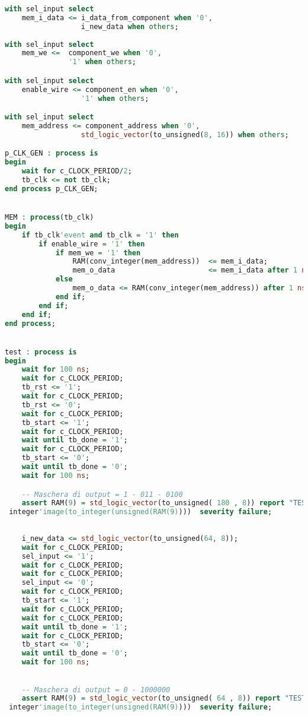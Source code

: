 \documentclass [a4paper, 12pt]{article}
\begin{document}
\begin{lstlisting}[language=VHDL, caption=tb\_pfrl\_2020\_repeated.vhd, basicstyle=\tiny, breaklines]
with sel_input select
    mem_i_data <= i_data_from_component when '0',
                  i_new_data when others;
                  
with sel_input select
    mem_we <=  component_we when '0',
               '1' when others;

with sel_input select
    enable_wire <= component_en when '0',
                  '1' when others;

with sel_input select
    mem_address <= component_address when '0',
                  std_logic_vector(to_unsigned(8, 16)) when others;

p_CLK_GEN : process is
begin
    wait for c_CLOCK_PERIOD/2;
    tb_clk <= not tb_clk;
end process p_CLK_GEN;


MEM : process(tb_clk)
begin
    if tb_clk'event and tb_clk = '1' then
        if enable_wire = '1' then
            if mem_we = '1' then
                RAM(conv_integer(mem_address))  <= mem_i_data;
                mem_o_data                      <= mem_i_data after 1 ns;
            else
                mem_o_data <= RAM(conv_integer(mem_address)) after 1 ns;
            end if;
        end if;
    end if;
end process;


test : process is
begin 
    wait for 100 ns;
    wait for c_CLOCK_PERIOD;
    tb_rst <= '1';
    wait for c_CLOCK_PERIOD;
    tb_rst <= '0';
    wait for c_CLOCK_PERIOD;
    tb_start <= '1';
    wait for c_CLOCK_PERIOD;
    wait until tb_done = '1';
    wait for c_CLOCK_PERIOD;
    tb_start <= '0';
    wait until tb_done = '0';
    wait for 100 ns;

    -- Maschera di output = 1 - 011 - 0100
    assert RAM(9) = std_logic_vector(to_unsigned( 180 , 8)) report "TEST FALLITO. Expected  180  found " &
 integer'image(to_integer(unsigned(RAM(9))))  severity failure;
    
    
    i_new_data <= std_logic_vector(to_unsigned(64, 8));
    wait for c_CLOCK_PERIOD;
    sel_input <= '1';
    wait for c_CLOCK_PERIOD;
    wait for c_CLOCK_PERIOD;
    sel_input <= '0';
    wait for c_CLOCK_PERIOD;
    tb_start <= '1';
    wait for c_CLOCK_PERIOD;
    wait for c_CLOCK_PERIOD;
    wait until tb_done = '1';
    wait for c_CLOCK_PERIOD;
    tb_start <= '0';
    wait until tb_done = '0';
    wait for 100 ns;

    
    -- Maschera di output = 0 - 1000000
    assert RAM(9) = std_logic_vector(to_unsigned( 64 , 8)) report "TEST FALLITO. Expected  64  found " &
 integer'image(to_integer(unsigned(RAM(9))))  severity failure;
    

\end{lstlisting}
\end{document}
